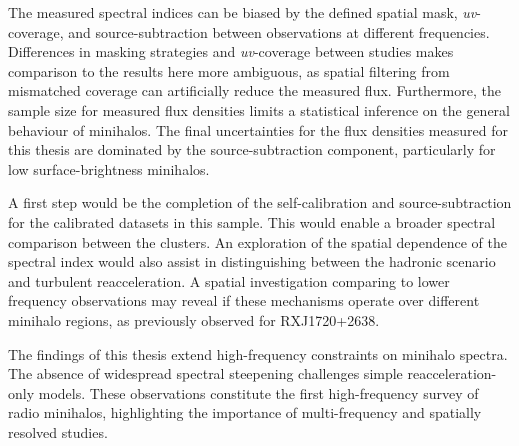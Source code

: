 The measured spectral indices can be biased by the defined spatial mask, \textit{uv}-coverage, and source-subtraction between observations at different frequencies. Differences in masking strategies and \textit{uv}-coverage between studies makes comparison to the results here more ambiguous, as spatial filtering from mismatched coverage can artificially reduce the measured flux. Furthermore, the sample size for measured flux densities limits a statistical inference on the general behaviour of minihalos. The final uncertainties for the flux densities measured for this thesis are dominated by the source-subtraction component, particularly for low surface-brightness minihalos.

A first step would be the completion of the self-calibration and source-subtraction for the calibrated datasets in this sample. This would enable a broader spectral comparison between the clusters. An exploration of the spatial dependence of the spectral index would also assist in distinguishing between the hadronic scenario and turbulent reacceleration. A spatial investigation comparing to lower frequency observations may reveal if these mechanisms operate over different minihalo regions, as previously observed for RXJ1720+2638. 

The findings of this thesis extend high-frequency constraints on minihalo spectra. The absence of widespread spectral steepening challenges simple reacceleration-only models. These observations constitute the first high-frequency survey of radio minihalos, highlighting the importance of multi-frequency and spatially resolved studies. 